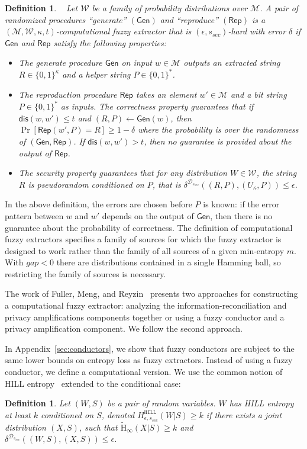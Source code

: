 \documentclass[11pt]{article}
\newcommand{\apref}[1]{\mbox{Appendix~\ref{#1}}}
\newcommand{\class}[1]{{\ensuremath{\mathsf{#1}}}}
\newcommand{\gen}{\ensuremath{\class{Gen}}\xspace}
\newcommand{\rep}{\ensuremath{\class{Rep}}\xspace}
\newcommand{\dis}{\ensuremath{\mathsf{dis}}}
\newcommand{\hill}{\ensuremath{\mathtt{HILL}}\xspace}
\newcommand{\Hav}{\tilde{\mathrm{H}}_\infty}
\newtheorem{definition}[theorem]{Definition}
\begin{document}
\begin{definition}~\cite[Definition 2.5]{fuller2013computational}
\label{def:comp fuzzy extractor}
Let $\mathcal{W}$ be a family of probability distributions over $\mathcal{M}$. A pair of randomized procedures ``generate'' $(\gen)$ and ``reproduce'' $(\rep)$ is a $(\mathcal{M}, \mathcal{W}, \kappa, t)$-\emph{computational fuzzy extractor} that is $(\epsilon, s_{sec})$-hard with error $\delta$ if \gen and \rep satisfy the following properties:
\begin{itemize}
\item The generate procedure \gen on input $w\in \mathcal{M}$ outputs an extracted string $R\in\{0,1\}^\kappa$ and a helper string $P\in\{0,1\}^*$.
\item The reproduction procedure \rep takes an element $w'\in\mathcal{M}$ and a bit string $P\in\{0,1\}^*$ as inputs.  The \emph{correctness} property guarantees that if $\dis(w, w')\leq t$ and $(R, P)\leftarrow \gen(w)$, then $\Pr[\rep( w', P) = R] \geq 1-\delta$ where the probability is over the randomness of $(\gen, \rep)$.  
If $\dis(w, w') > t$, then no guarantee is provided about the output of \rep.
\item The \emph{security} property guarantees that for any distribution $W\in \mathcal{W}$, the string $R$ is pseudorandom conditioned on $P$, that is $\delta^{\mathcal{D}_{s_{sec}}}((R, P), (U_\kappa, P))\leq \epsilon$.
\end{itemize}
\end{definition}
In the above definition, the errors are chosen before $P$ is known: if the error pattern between $w$ and $w'$ depends on the output of $\gen$, then there is no guarantee about the probability of correctness.
The definition of computational fuzzy extractors specifies a family of sources for which the fuzzy extractor is designed to work rather than the family of all sources of a given min-entropy $m$.  With $gap<0$ there are distributions contained in a single Hamming ball, so restricting the family of sources is necessary.

The work of Fuller, Meng, and Reyzin~\cite{fuller2013computational} presents two approaches for constructing a computational fuzzy extractor: analyzing the information-reconciliation and privacy amplifications components together or using a fuzzy conductor and a privacy amplification component.  We follow the second approach.  

In \apref{sec:conductors}, we show that fuzzy conductors are subject to the same lower bounds on entropy loss as fuzzy extractors.  Instead of using a fuzzy conductor, we define a computational version.  
We use the common notion of HILL entropy~\cite{DBLP:journals/siamcomp/HastadILL99} extended to the conditional case:
\begin{definition}
\label{def:hill ent}
Let $(W, S)$ be a pair of random variables.  $W$ has 
\emph{HILL entropy} at least $k$ conditioned on $S$,
denoted $H^{\hill}_{\epsilon, s_{sec}}(W|S)\geq k$ if there exists a joint distribution $(X, S)$, such that $\Hav(X|S)\geq k$ and $\delta^{\mathcal{D}_{s_{sec}}} ((W, S),(X,S))\leq \epsilon$.
\end{definition}
\end{document}
